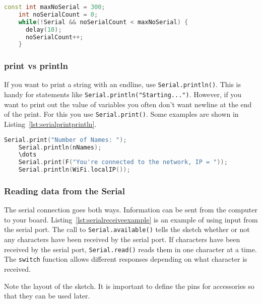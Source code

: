 \begin{lstlisting}[language=C++, caption={This snippet tries connecting to Serial a fixed 
    number of times so that it will delay less than Listing~\ref{lst:serialstartdelay} if 
    a serial connection exists.},label={lst:serialstartcount}]
    const int maxNoSerial = 300;
    int noSerialCount = 0;
    while(!Serial && noSerialCount < maxNoSerial) {
      delay(10);
      noSerialCount++;
    }
\end{lstlisting}

\subsubsection{print vs println}
If you want to print a string with an endline, use \lstinline$Serial.println()$. This is 
handy for statements like \lstinline$Serial.println("Starting...")$. However, if you 
want to print out the value of variables you often don't want newline at the end of
the print. For this you use \lstinline$Serial.print()$. Some examples are shown in 
Listing~\ref{lst:serialprintprintln}.
\begin{lstlisting}[language=C++, caption={This snippet shows using print and println},label={lst:serialprintprintln}]
    Serial.print("Number of Names: ");
    Serial.println(nNames);
    \dots
    Serial.print(F("You're connected to the network, IP = "));
    Serial.println(WiFi.localIP());    
\end{lstlisting}

\subsubsection{Reading data from the Serial}
The serial connection goes both ways. Information can be sent from the computer to 
your board. Listing~\ref{lst:serialreceiveexample} is an example of using input from 
the serial port. The call to \lstinline$Serial.available()$ tells the sketch whether
or not any characters have been received by the serial port. If characters have been
received by the serial port, \lstinline$Serial.read()$ reads them in one character at 
a time. The \lstinline$switch$ function allows different responses depending on what 
character is received. 

Note the layout of the sketch. It is important to define the pins for accessories so 
that they can be used later. 


